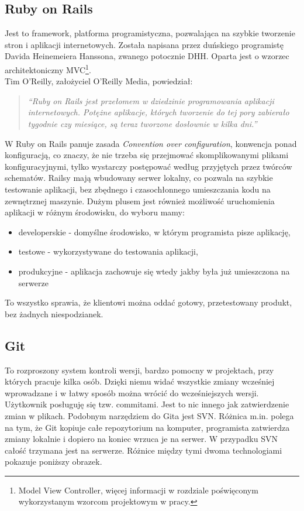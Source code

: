   \subsection{Ruby on Rails}
  Jest to framework, platforma programistyczna, pozwalająca na szybkie tworzenie stron i aplikacji internetowych. Została napisana przez duńskiego programistę Davida Heinemeiera Hanssona, zwanego potocznie DHH. Oparta jest o wzorzec architektoniczny MVC\footnote{Model View Controller, więcej informacji w rozdziale poświęconym wykorzystanym wzorcom projektowym w pracy.}. \\
  Tim O'Reilly, założyciel O'Reilly Media, powiedział:
  \begin{quote}
    \emph{“Ruby on Rails jest przełomem w dziedzinie programowania aplikacji internetowych.
    Potężne aplikacje, których tworzenie do tej pory zabierało tygodnie czy miesiące, są teraz tworzone dosłownie w kilka dni.”}
  \end{quote}
  W Ruby on Rails panuje zasada \emph{Convention over configuration}, konwencja ponad konfiguracją, co znaczy, że nie trzeba się przejmować skomplikowanymi plikami konfiguracyjnymi, tylko wystarczy postępować według przyjętych przez twórców schematów. Railsy mają wbudowany serwer lokalny, co pozwala na szybkie testowanie aplikacji, bez zbędnego i czasochłonnego umieszczania kodu na zewnętrznej maszynie. Dużym plusem jest również możliwość uruchomienia aplikacji w różnym środowisku, do wyboru mamy:
  \begin{itemize}
    \item developerskie - domyślne środowisko, w którym programista pisze aplikację,
    \item testowe - wykorzystywane do testowania aplikacji,
    \item produkcyjne - aplikacja zachowuje się wtedy jakby była już umieszczona na serwerze
  \end{itemize}
  To wszystko sprawia, że klientowi można oddać gotowy, przetestowany produkt, bez żadnych niespodzianek.


  \subsection{Git}
  To rozproszony system kontroli wersji, bardzo pomocny w projektach, przy których pracuje kilka osób. Dzięki niemu widać wszystkie zmiany wcześniej wprowadzane i w łatwy sposób można wrócić do wcześniejszych wersji. Użytkownik posługuję się tzw. commitami. Jest to nic innego jak zatwierdzenie zmian w plikach. Podobnym narzędziem do Gita jest SVN. Różnica m.in. polega na tym, że Git kopiuje całe repozytorium na komputer, programista zatwierdza zmiany lokalnie i dopiero na koniec wrzuca je na serwer. W przypadku SVN całość trzymana jest na serwerze. Różnice między tymi dwoma technologiami pokazuje poniższy obrazek.

